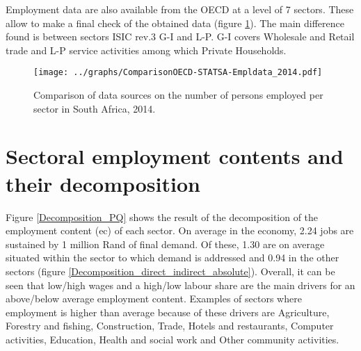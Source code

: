 \documentclass[12pt,english]{article}
\begin{document}

Employment data are also available from the OECD at a level of 7 sectors. These allow to make a final check of the obtained data (figure \ref{ComparisonOECD-STATSA-Empldata_2014}). The main difference found is between sectors ISIC rev.3 G-I and L-P. G-I covers Wholesale and Retail trade and L-P service activities among which Private Households.

\begin{figure}[!h]
	\centering
	\texttt{[image: ../graphs/ComparisonOECD-STATSA-Empldata\_2014.pdf]}
	\caption{\label{ComparisonOECD-STATSA-Empldata_2014}Comparison of data sources on the number of persons employed per sector in South Africa, 2014.}
\end{figure}


\section{Sectoral employment contents and their decomposition}\label{ec_results}


Figure \ref{Decomposition_PQ} shows the result of the decomposition of the employment content (ec) of each sector. %
On average in the economy, 2.24 jobs are sustained by 1 million Rand of final demand. Of these, 1.30 are on average situated within the sector to which demand is addressed and 0.94 in the other sectors (figure \ref{Decomposition_direct_indirect_absolute}). Overall, it can be seen that low/high wages and a high/low labour share are the main drivers for an above/below average employment content. Examples of sectors where employment is higher than average because of these drivers are Agriculture, Forestry and fishing, Construction, Trade, Hotels and restaurants, Computer activities, Education, Health and social work and Other community activities. 
\end{document}
